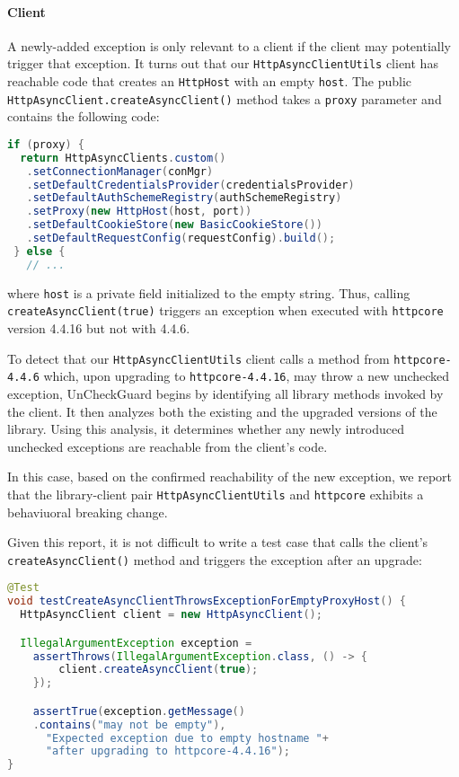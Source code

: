 \paragraph{Client} A newly-added exception is only relevant to a client if the client may potentially
trigger that exception. It turns out that our \texttt{HttpAsyncClientUtils} client has reachable code
that creates an \texttt{HttpHost} with an empty \texttt{host}. The
public \texttt{HttpAsyncClient.createAsyncClient()} method
takes a \texttt{proxy} parameter and contains the following code:
\begin{lstlisting}[language=Java,basicstyle=\scriptsize\ttfamily]
 if (proxy) {
  return HttpAsyncClients.custom()
   .setConnectionManager(conMgr)
   .setDefaultCredentialsProvider(credentialsProvider)
   .setDefaultAuthSchemeRegistry(authSchemeRegistry)
   .setProxy(new HttpHost(host, port))
   .setDefaultCookieStore(new BasicCookieStore())
   .setDefaultRequestConfig(requestConfig).build();
 } else {
   // ...
\end{lstlisting}
where \texttt{host} is a private field initialized to the empty string.
Thus, calling \texttt{createAsyncClient(true)} triggers an exception when executed with
\texttt{httpcore} version 4.4.16 but not with 4.4.6.

To detect that our \texttt{HttpAsyncClientUtils} client calls a method from \texttt{httpcore-4.4.6} which, upon upgrading to \texttt{httpcore-4.4.16}, may throw a new unchecked exception, UnCheckGuard begins by identifying all library methods invoked by the client. It then analyzes both the existing and the upgraded versions of the library. Using this analysis, it determines whether any newly introduced unchecked exceptions are reachable from the client's code.

In this case, based on the confirmed reachability of the new exception, we report that the library-client pair \texttt{HttpAsyncClientUtils} and \texttt{httpcore} exhibits a behaviuoral breaking change.

Given this report, it is not difficult to write a test case that calls the client's \texttt{createAsyncClient()} method
and triggers the exception after an upgrade:
\begin{lstlisting}[language=Java,basicstyle=\scriptsize\ttfamily]
@Test
void testCreateAsyncClientThrowsExceptionForEmptyProxyHost() {
  HttpAsyncClient client = new HttpAsyncClient();

  IllegalArgumentException exception =
    assertThrows(IllegalArgumentException.class, () -> {
        client.createAsyncClient(true);
    });

    assertTrue(exception.getMessage()
    .contains("may not be empty"),
      "Expected exception due to empty hostname "+
      "after upgrading to httpcore-4.4.16");
}
\end{lstlisting}




